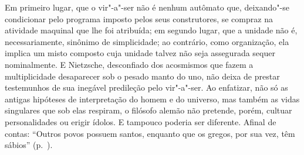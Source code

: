 Em primeiro lugar, que o vir"-a"-ser não é nenhum autômato que, deixando"-se
condicionar pelo programa imposto pelos seus construtores, se compraz na
atividade maquinal que lhe foi atribuída; em segundo lugar, que a unidade não
é, necessariamente, sinônimo de simplicidade; ao contrário, como organização,
ela implica um misto composto cuja unidade talvez não seja assegurada sequer
nominalmente. E Nietzsche, desconfiado dos acosmismos que fazem a
multiplicidade desaparecer sob o pesado manto do uno, não deixa de prestar
testemunhos de sua inegável predileção pelo vir"-a"-ser. Ao enfatizar, não só
as antigas hipóteses de interpretação do homem e do universo, mas também as
vidas singulares que sob elas respiram, o filósofo alemão não pretende,
porém, cultuar personalidades ou erigir ídolos. E tampouco poderia ser
diferente. Afinal de contas: ``Outros povos possuem santos, enquanto que os
gregos, por sua vez, têm sábios'' (p.~\pageref{santos}).
